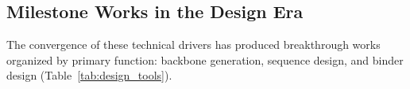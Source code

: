 \subsection{Milestone Works in the Design Era}
\label{subsec:milestones}

The convergence of these technical drivers has produced breakthrough works organized by primary function: backbone generation, sequence design, and binder design (Table~\ref{tab:design_tools}).

%
%
%
%
%
%
%

